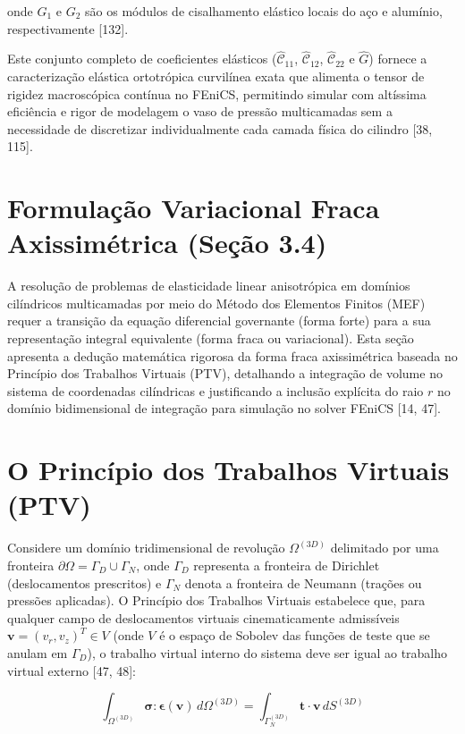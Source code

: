 onde $G_1$ e $G_2$ são os módulos de cisalhamento elástico locais do aço e alumínio, respectivamente [132].

Este conjunto completo de coeficientes elásticos ($\hat{\mathcal{C}}_{11}$, $\hat{\mathcal{C}}_{12}$, $\hat{\mathcal{C}}_{22}$ e $\hat{G}$) fornece a caracterização elástica ortotrópica curvilínea exata que alimenta o tensor de rigidez macroscópica contínua no FEniCS, permitindo simular com altíssima eficiência e rigor de modelagem o vaso de pressão multicamadas sem a necessidade de discretizar individualmente cada camada física do cilindro [38, 115].

\section{Formulação Variacional Fraca Axissimétrica (Seção 3.4)}

A resolução de problemas de elasticidade linear anisotrópica em domínios cilíndricos multicamadas por meio do Método dos Elementos Finitos (MEF) requer a transição da equação diferencial governante (forma forte) para a sua representação integral equivalente (forma fraca ou variacional). Esta seção apresenta a dedução matemática rigorosa da forma fraca axissimétrica baseada no Princípio dos Trabalhos Virtuais (PTV), detalhando a integração de volume no sistema de coordenadas cilíndricas e justificando a inclusão explícita do raio $r$ no domínio bidimensional de integração para simulação no solver FEniCS [14, 47].

\section{O Princípio dos Trabalhos Virtuais (PTV)}

Considere um domínio tridimensional de revolução $\Omega^{(3D)}$ delimitado por uma fronteira $\partial \Omega = \Gamma_D \cup \Gamma_N$, onde $\Gamma_D$ representa a fronteira de Dirichlet (deslocamentos prescritos) e $\Gamma_N$ denota a fronteira de Neumann (trações ou pressões aplicadas). O Princípio dos Trabalhos Virtuais estabelece que, para qualquer campo de deslocamentos virtuais cinematicamente admissíveis $\mathbf{v} = (v_r, v_z)^T \in V$ (onde $V$ é o espaço de Sobolev das funções de teste que se anulam em $\Gamma_D$), o trabalho virtual interno do sistema deve ser igual ao trabalho virtual externo [47, 48]:

\begin{equation}
  \int_{\Omega^{(3D)}} \mathbf{\sigma} : \mathbf{\epsilon}(\mathbf{v}) \, d \Omega^{(3D)} = \int_{\Gamma_N^{(3D)}} \mathbf{t} \cdot \mathbf{v} \, d S^{(3D)}
  \label{eq:ptv_3d}
\end{equation}


